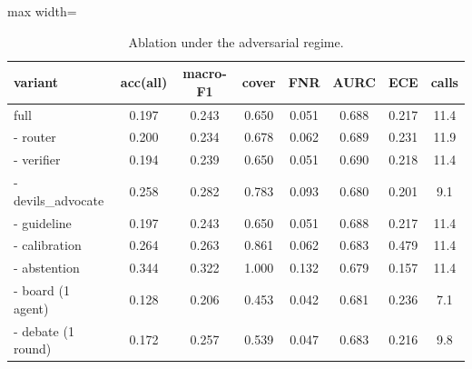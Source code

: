 \documentclass[12pt]{article}
\begin{document}
\begin{table}[htbp]
\centering
\small
\renewcommand{\arraystretch}{1.25}
\setlength{\tabcolsep}{5pt}
\begin{adjustbox}{max width=\linewidth}
\begin{tabular}{|l|c|c|c|c|c|c|c|}
\hline
\rowcolor{tblhead}
\textbf{variant} & \textbf{acc(all)} & \textbf{macro-F1} & \textbf{cover} & \textbf{FNR} & \textbf{AURC} & \textbf{ECE} & \textbf{calls} \\ \hline
full & 0.197 & 0.243 & 0.650 & 0.051 & 0.688 & 0.217 & 11.4 \\
\hline
- router & 0.200 & 0.234 & 0.678 & 0.062 & 0.689 & 0.231 & 11.9 \\
\hline
- verifier & 0.194 & 0.239 & 0.650 & 0.051 & 0.690 & 0.218 & 11.4 \\
\hline
- devils\_advocate & 0.258 & 0.282 & 0.783 & 0.093 & 0.680 & 0.201 & 9.1 \\
\hline
- guideline & 0.197 & 0.243 & 0.650 & 0.051 & 0.688 & 0.217 & 11.4 \\
\hline
- calibration & 0.264 & 0.263 & 0.861 & 0.062 & 0.683 & 0.479 & 11.4 \\
\hline
- abstention & 0.344 & 0.322 & 1.000 & 0.132 & 0.679 & 0.157 & 11.4 \\
\hline
- board (1 agent) & 0.128 & 0.206 & 0.453 & 0.042 & 0.681 & 0.236 & 7.1 \\
\hline
- debate (1 round) & 0.172 & 0.257 & 0.539 & 0.047 & 0.683 & 0.216 & 9.8 \\
\hline
\end{tabular}
\end{adjustbox}
\caption{Ablation under the adversarial regime.}
\label{tab:abl-adversarial}
\end{table}
\end{document}
